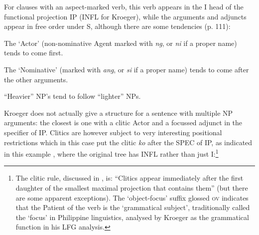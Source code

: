 \documentclass[output=paper,hidelinks]{langscibook}
\begin{document}
For clauses with an aspect-marked verb, this verb appears in the I
head of the functional projection
IP (INFL for Kroeger), 
while the arguments and adjuncts appear in free order under S, although there
are some tendencies (p. 111):
\ea
\begin{xlist}
\item The `Actor' (non-nominative Agent marked with {\it ng}, or {\it ni} if
a proper name) tends to come first.
\item The `Nominative' (marked with {\it ang}, or {\it si} if a proper name) tends
  to come after the other arguments.
\item ``Heavier'' NP's tend to follow ``lighter'' NPs.
\end{xlist}
\z
Kroeger does not actually give a structure for a sentence with multiple NP
arguments: the closest is one with a clitic Actor and a focussed adjunct in the specifier of IP. Clitics are however subject to very interesting positional restrictions which
in this case put the clitic {\it ko} after the SPEC of IP, as indicated in this example
\citep[129]{Kroeger93}, where the original tree has INFL rather than just I:\footnote
 {The clitic rule, discussed in \citet[119-123]{Kroeger93}, is: ``Clitics
 appear immediately after the first daughter of the smallest maximal projection that
 contains them'' (but there are some apparent exceptions).  The `object-focus' suffix
 glossed \textsc{ov} indicates that the Patient of the verb is the `grammatical
 subject', traditionally called the `focus' in Philippine linguistics, analysed
 by Kroeger as the {\SUBJ} grammatical function in his LFG analysis.}
\end{document}
